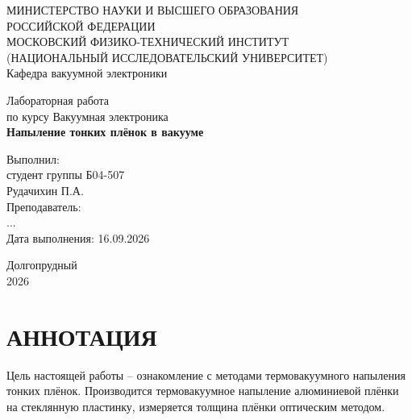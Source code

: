 \documentclass[a4paper, 14pt]{extarticle}
\begin{document}
	
	\begin{titlepage}
		\centering
		\singlespacing %
		{\small МИНИСТЕРСТВО НАУКИ И ВЫСШЕГО ОБРАЗОВАНИЯ \\ РОССИЙСКОЙ ФЕДЕРАЦИИ\\
			МОСКОВСКИЙ ФИЗИКО-ТЕХНИЧЕСКИЙ ИНСТИТУТ\\
			(НАЦИОНАЛЬНЫЙ ИССЛЕДОВАТЕЛЬСКИЙ УНИВЕРСИТЕТ)\\
			\vspace {1cm}
			Кафедра вакуумной электроники\\}
		
		\vspace{4cm}
		
		Лабораторная работа \\
		по курсу Вакуумная электроника\\
		{\Large \textbf{Напыление тонких плёнок в вакууме}\\}
		
		\vspace{3cm}
		
		\begin{flushright}
			\begin{minipage}{0.45\textwidth}
				\raggedright
				Выполнил: \\
				студент группы Б04-507 \\
				Рудачихин П.А. \\
				\vspace{0.5cm}
				Преподаватель: \\
				... \\
				\vspace{0.5cm}
				Дата выполнения: 16.09.2026
			\end{minipage}
		\end{flushright}
		
		\vfill
		
		Долгопрудный \\
		2026
	\end{titlepage}
	
	\section*{АННОТАЦИЯ} %
	
	Цель настоящей работы -- ознакомление с методами термовакуумного напыления тонких плёнок. Производится термовакуумное напыление алюминиевой плёнки на стеклянную пластинку, измеряется толщина плёнки оптическим методом.
	
\end{document}

